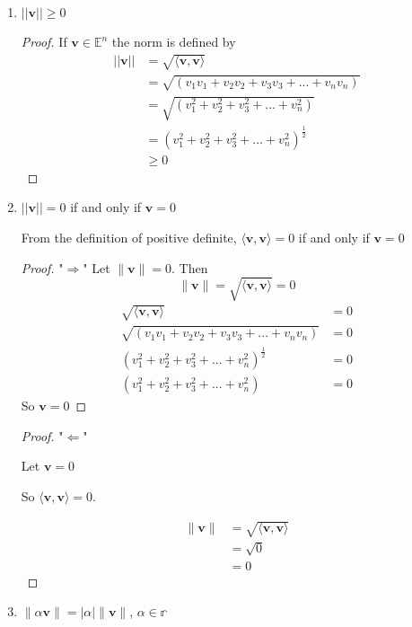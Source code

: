 \documentclass{tufte-book}
\theoremstyle{mytheoremstyle}
\theoremstyle{mylemstyle}
\theoremstyle{mydefstyle}
\begin{document}
\begin{enumerate}

\item $||\mathbf{v}|| \geq 0$

\begin{proof}
If $\mathbf{v} \in \mathbb{E}^n$ the norm is defined by
\begin{align*}
||\mathbf{v}|| &= \sqrt{\langle \mathbf{v}, \mathbf{v} \rangle}\\
&= \sqrt{(v_1v_1 + v_2v_2 + v_3v_3 +...+v_nv_n)} \\
&= \sqrt{(v_1^2 + v_2^2 + v_3^2 +...+v_n^2)} \\
&= (v_1^2 + v_2^2 + v_3^2 +...+v_n^2)^{\frac{1}{2}} \\
&\geq 0
\end{align*}
\end{proof}

\item $||\mathbf{v}|| = 0$ if and only if $\mathbf{v} = 0$

From the definition of positive definite, $\langle \mathbf{v}, \mathbf{v} \rangle = 0$ if and only if $\mathbf{v} = 0$ 
\begin{proof} "$\Rightarrow$"
Let $\|\mathbf{v}\| = 0$.  Then 
\[ \|\mathbf{v}\| = \sqrt{\langle \mathbf{v}, \mathbf{v} \rangle} = 0 \]
\begin{align*}
\sqrt{\langle \mathbf{v}, \mathbf{v} \rangle} &= 0\\
\sqrt{(v_1v_1 + v_2v_2 + v_3v_3 +...+v_nv_n)} &= 0\\
(v_1^2 + v_2^2 + v_3^2 +...+v_n^2)^{\frac{1}{2}} &= 0 \\
(v_1^2 + v_2^2 + v_3^2 +...+v_n^2)&= 0
\end{align*}
So $\mathbf{v} = 0$
\end{proof}

\begin{proof} "$\Leftarrow$"

Let $\mathbf{v} = 0$

So $\langle \mathbf{v}, \mathbf{v} \rangle = 0$. 

\begin{align*}
\|\mathbf{v}\| &= \sqrt{\langle \mathbf{v}, \mathbf{v} \rangle} \\ 
&= \sqrt{0} \\
&= 0
\end{align*}
\end{proof}

\item $\|\alpha \mathbf{v}\| = |\alpha| \|\mathbf{v}\|$, $\alpha \in \mathbb{r}$ 


\end{enumerate}
\end{document}
